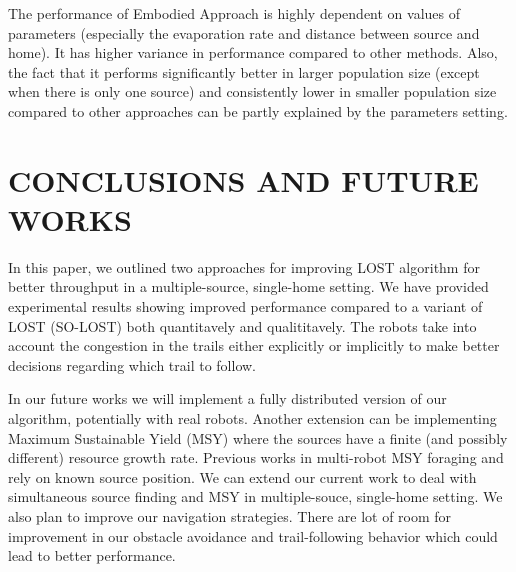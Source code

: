 \documentclass[letterpaper, 10 pt, conference]{ieeeconf}  %
\begin{document}
The performance of Embodied Approach is highly dependent on values of parameters (especially the evaporation rate and distance between source and home). It has higher variance in performance compared to other methods. Also, the fact that it performs significantly better in larger population size (except when there is only one source) and consistently lower in smaller population size compared to other approaches can be partly explained by the parameters setting.


\section{CONCLUSIONS AND FUTURE WORKS}

In this paper, we outlined two approaches for improving LOST algorithm for better throughput in a multiple-source, single-home setting. We have provided experimental results showing improved performance compared to a variant of LOST (SO-LOST) both quantitavely and qualititavely.  The robots take into account the congestion in the trails either explicitly or implicitly to make better decisions regarding which trail to follow. 

In our future works we will implement a fully distributed version of our algorithm, potentially with real robots. Another extension can be implementing Maximum Sustainable Yield (MSY) \cite{MSY_Hjor1933} where the sources have a finite (and possibly different) resource growth rate. Previous works in multi-robot MSY foraging \cite{songmulti} and \cite{zhangmaximum} rely on known source position. We can extend our current work to deal with simultaneous source finding and MSY in multiple-souce, single-home setting. We also plan to improve our navigation strategies. There are lot of room for improvement in our obstacle avoidance and trail-following behavior which could lead to better performance. 


\addtolength{\textheight}{-12cm}   %
\end{document}
